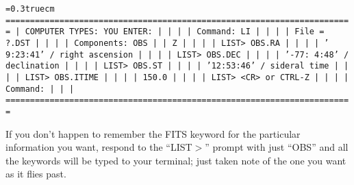 \bigskip
{\noindent\obeylines\obeyspaces\frenchspacing\tt\baselineskip=0.3truecm
=======================================================================
| COMPUTER TYPES:                                  YOU ENTER:         |
|                                                                     |
| Command:                                         LI                 |
|                                                                     |
|           File = ?.DST                                              |
|                                                                     |
|      Components: OBS                                                |
|                  Z                                                  |
|                                                                     |
| LIST>                                            OBS.RA             |
|                                                                     |
|           ' 9:23:41'  / right ascension                             |
|                                                                     |
| LIST>                                            OBS.DEC            |
|                                                                     |
|           '-77: 4:48' / declination                                 |
|                                                                     |
| LIST>                                            OBS.ST             |
|                                                                     |
|           '12:53:46'  / sideral time                                |
|                                                                     |
| LIST>                                            OBS.ITIME          |
|                                                                     |
|           150.0                                                     |
|                                                                     |
| LIST>                                            <CR> or CTRL-Z     |
|                                                                     |
| Command:                                                            |
|                                                                     |
=======================================================================
}
\bigskip

If you don't happen to remember the FITS keyword for the particular
information you want, respond to the ``LIST$>$'' prompt with just
``OBS'' and all the keywords will be typed to your terminal; just taken
note of the one you want as it flies past.

